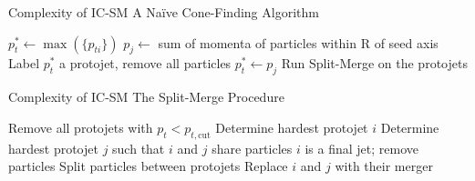\documentclass[xcolor={dvipsnames}]{beamer}
\begin{document}
\begin{frame}{Complexity of IC-SM}
\alert{A Naïve Cone-Finding Algorithm}
\begin{algorithm}[H]
    \caption{Iterative Cone with Split-Merge}
    \begin{algorithmic}[1]
        \Repeat
            \State $p_t^* \gets \max(\{p_{ti}\})$ 
            \Repeat
                \State $p_j \gets$ sum of momenta of particles within R of seed axis
                    \State Label $p_t^*$ a protojet, remove all particles
                \Else
                    \State $p_t^* \gets p_j$
                \EndIf
        \State Run Split-Merge on the protojets
    \end{algorithmic}
\end{algorithm}
\end{frame}

\begin{frame}{Complexity of IC-SM}
\alert{The Split-Merge Procedure}
\begin{algorithm}[H]
    \caption{Split-Merge}
    \begin{algorithmic}[1]
        \State Remove all protojets with $p_t < p_{t,\text{cut}}$
        \Repeat
            \State Determine hardest protojet $i$
            \State Determine hardest protojet $j$ such that $i$ and $j$ share particles
                \State $i$ is a final jet; remove particles
            \Else
                    \State Split particles between protojets
                \Else
                    \State Replace $i$ and $j$ with their merger
                \EndIf
            \EndIf
    \end{algorithmic}
\end{algorithm}
\end{frame}
\end{document}
